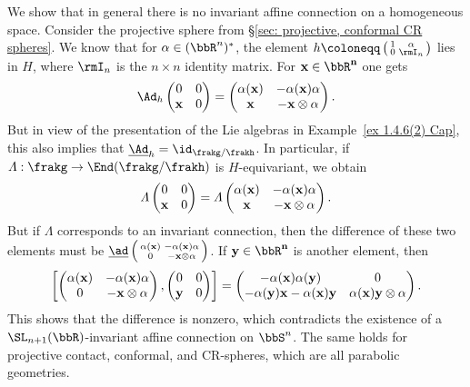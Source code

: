 \begin{example}\label{ex 1.4.8 Cap}
    We show that in general there is no invariant affine connection on a homogeneous space. Consider the projective sphere from \S\ref{sec: projective, conformal CR spheres}. We know that for $\alpha\in (\bbR^n)^\ast$, the element $h\coloneqq \left(\begin{smallmatrix}
        1&\alpha \\ 0& \rmI_n
    \end{smallmatrix}\right)$
    lies in $H$, where $\rmI_n$ is the $n\times n$ identity matrix. For $\bf{x}\in\bbR^n$ one gets 
    \[\Ad_h \begin{pmatrix}
        0&0\\ \bf{x}&0
    \end{pmatrix}=
    \begin{pmatrix}
        \alpha(\bf{x})&-\alpha(\bf{x})\alpha\\
        \bf{x}&-\bf{x}\otimes\alpha 
    \end{pmatrix}.
    \]
    But in view of the presentation of the Lie algebras in Example~\ref{ex 1.4.6(2) Cap}, this also implies that $\underline{\Ad}_h=\id_{\frakg\slash\frakh}$. In particular, if $\varLambda:\frakg\to \End(\frakg\slash\frakh)$ is $H$-equivariant, we obtain 
    \[\varLambda \begin{pmatrix}
        0&0\\\bf{x}&0
    \end{pmatrix}=
    \varLambda \begin{pmatrix}
        \alpha(\bf{x})&-\alpha(\bf{x})\alpha\\
        \bf{x}&-\bf{x}\otimes\alpha 
    \end{pmatrix}.\]
    But if $\varLambda$ corresponds to an invariant connection, then the difference of these two elements must be $\underline{\ad}\left(\begin{smallmatrix}
        \alpha(\bf{x})&-\alpha(\bf{x})\alpha\\
        0& -\bf{x}\otimes\alpha
    \end{smallmatrix}\right)$. If $\bf{y}\in\bbR^n$ is another element, then 
    \[\left[
    \begin{pmatrix}
        \alpha(\bf{x})&-\alpha(\bf{x})\alpha\\
        0& -\bf{x}\otimes\alpha
    \end{pmatrix},
    \begin{pmatrix}
        0&0\\\bf{y}&0
    \end{pmatrix}
    \right]=
    \begin{pmatrix}
        -\alpha(\bf{x})\alpha(\bf{y})&0\\
        -\alpha(\bf{y})\bf{x}-\alpha(\bf{x})\bf{y}&\alpha(\bf{x})\bf{y}\otimes\alpha
    \end{pmatrix}.
    \]
    This shows that the difference is nonzero, which contradicts the existence of a $\SL_{n+1}(\bbR)$-invariant affine connection on $\bbS^n$. The same holds for projective contact, conformal, and CR-spheres, which are all parabolic geometries.
\end{example}


